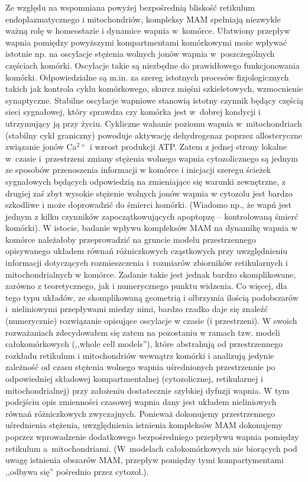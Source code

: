 Ze względu na wspomniana powyżej bezpośrednią bliskość retikulum endoplazmatycznego i mitochondriów, kompleksy MAM spełniają niezwykle ważną rolę w homeostazie i dynamice wapnia w~komórce. Ułatwiony przepływ wapnia pomiędzy powyższymi kompartmentami komórkowymi może wpływać istotnie np. na oscylacje stężenia wolnych jonów wapnia w~poszczególnych częściach komórki. Oscylacje takie są niezbędne do prawidłowego funkcjonowania komórki. Odpowiedzialne są m.in. za szereg istotnych procesów fizjologicznych takich jak kontrola cyklu komórkowego, skurcz mięśni szkieletowych, wzmocnienie synaptyczne. Stabilne oscylacje wapniowe stanowią istotny czynnik będący częścią sieci sygnałowej, który sprawdza czy komórka jest w~dobrej kondycji i utrzymujący ją przy życiu. Cykliczne wahanie poziomu wapnia w~mitochondriach (stabilny cykl graniczny) powoduje aktywację dehydrogenaz poprzez allosteryczne związanie jonów Ca$^{2+}$ i wzrost produkcji ATP. Zatem z  jednej strony lokalne w~czasie i~przestrzeni zmiany stężenia wolnego wapnia cytozolicznego są jednym ze sposobów przenoszenia informacji w komórce i inicjacji szeregu ścieżek sygnałowych będących odpowiedzią na zmieniające się warunki zewnętrzne, z drugiej zaś zbyt wysokie stężenie wolnych jonów wapnia w cytozolu jest bardzo szkodliwe i może doprowadzić do śmierci komórki. (Wiadomo np., że wapń jest jednym z kilku czynników zapoczątkowujących apoptopzę – kontrolowaną śmierć komórki). W istocie, badanie wpływu kompleksów MAM na dynamikę wapnia w komórce należałoby przeprowadzić na gruncie modelu przestrzennego opisywanego układem równań różniczkowych cząstkowych przy uwzględnieniu informacji dotyczących  rozmieszczenia i~rozmiarów zbiorników retikularnych i mitochondrialnych w komórce. Zadanie takie jest jednak bardzo skomplikowane, zarówno z teoretycznego, jak i numerycznego punktu widzenia. Co więcej, dla tego typu układów, ze skomplikowaną geometrią i olbrzymia ilością podobszarów i~nieliniowymi przepływami miedzy nimi, bardzo rzadko daje się znaleźć  (numerycznie) rozwiązanie opisujące oscylacje w czasie (i przestrzeni). W swoich rozważaniach zdecydowałem się zatem na pozostaniu w ramach tzw. modeli całokomórkowych (,,whole cell models''), które abstrahują od przestrzennego rozkładu retikulum i mitochondriów wewnątrz komórki i analizują jedynie zależność od czasu stężenia wolnego wapnia uśrednionych przestrzennie po odpowiedniej składowej kompartmentalnej (cytozolicznej, retikularnej i mitochondrialnej) przy założeniu dostatecznie szybkiej dyfuzji wapnia. W tym podejściu opis zmienności czasowej wapnia dany jest układem nieliniowych równań różniczkowych zwyczajnych. Ponieważ dokonujemy przestrzennego uśrednienia stężenia, uwzględnienia istnienia kompleksów MAM dokonujemy poprzez wprowadzenie dodatkowego bezpośredniego przepływu wapnia pomiędzy retikulum a~mitochondriami. (W~modelach całokomórkowych nie biorących pod uwagę  istnienia obszarów MAM, przepływ pomiędzy tymi kompartymentami ,,odbywa się'' pośrednio przez cytozol.).

